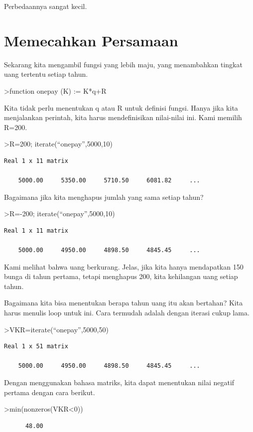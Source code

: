\documentclass[
]{book}
\begin{document}
Perbedaannya sangat kecil.

\section{Memecahkan Persamaan}\label{memecahkan-persamaan}

Sekarang kita mengambil fungsi yang lebih maju, yang menambahkan tingkat uang tertentu setiap tahun.

\textgreater function onepay (K) := K*q+R

Kita tidak perlu menentukan q atau R untuk definisi fungsi. Hanya jika kita menjalankan perintah, kita harus mendefinisikan nilai-nilai ini. Kami memilih R=200.

\textgreater R=200; iterate(``onepay'',5000,10)

\begin{verbatim}
Real 1 x 11 matrix

    5000.00     5350.00     5710.50     6081.82     ...
\end{verbatim}

Bagaimana jika kita menghapus jumlah yang sama setiap tahun?

\textgreater R=-200; iterate(``onepay'',5000,10)

\begin{verbatim}
Real 1 x 11 matrix

    5000.00     4950.00     4898.50     4845.45     ...
\end{verbatim}

Kami melihat bahwa uang berkurang. Jelas, jika kita hanya mendapatkan 150 bunga di tahun pertama, tetapi menghapus 200, kita kehilangan uang setiap tahun.

Bagaimana kita bisa menentukan berapa tahun uang itu akan bertahan? Kita harus menulis loop untuk ini. Cara termudah adalah dengan iterasi cukup lama.

\textgreater VKR=iterate(``onepay'',5000,50)

\begin{verbatim}
Real 1 x 51 matrix

    5000.00     4950.00     4898.50     4845.45     ...
\end{verbatim}

Dengan menggunakan bahasa matriks, kita dapat menentukan nilai negatif pertama dengan cara berikut.

\textgreater min(nonzeros(VKR\textless0))

\begin{verbatim}
      48.00 
\end{verbatim}
\end{document}
